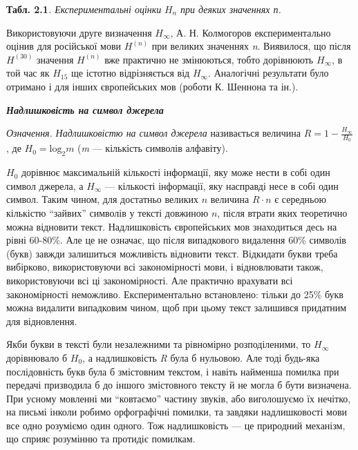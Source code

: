 \bigskip

{\centering
\textbf{Табл. 2.1}\textit{. Експериментальні оцінки } ${H_{{n}}}$ \textit{при
деяких значеннях п.  }
\par}


\bigskip

Використовуючи друге визначення  ${H_{{\infty }}}$, А. Н. Колмогоров
експериментально оцінив для російської мови  ${H^{{(n)}}}$ при великих
значеннях \textit{n}. Виявилося, що після  ${H^{{(\text{30})}}}$ значення 
${H^{{(n)}}}$ вже практично не змінюються, тобто дорівнюють  ${H_{{\infty }}}$,
в той час як  ${H_{{\text{15}}}}$ ще істотно відрізняється від  ${H_{{\infty
}}}$. Аналогічні результати було отримано  і для інших європейських мов (роботи
К. Шеннона та ін.).


\bigskip


\bigskip

{\centering\bfseries\itshape
Надлишковість на символ джерела
\par}


\bigskip


\bigskip

\textit{Означення.} \textit{Надлишковістю на символ джерела} називається
величина  ${R=1-\frac{H_{{\infty }}}{H_{{0}}}}$, де 
${H_{{0}}=\text{log}_{{2}}m}$ (\textit{m} --- кількість символів алфавіту).

 ${H_{{0}}}$ дорівнює максимальній кількості інформації, яку може нести в собі
один символ джерела, а  ${H_{{\infty }}}$ --- кількості інформації, яку насправді
несе в собі один символ. Таким чином, для достатньо великих  ${n}$ величина 
${R\cdot n}$ є середньою кількістю “зайвих” символів у тексті довжиною  ${n}$,
після втрати яких теоретично можна відновити текст. Надлишковість європейських
мов знаходиться десь на рівні 60-80\%. Але це не означає, що після випадкового
видалення 60\% символів (букв) завжди залишиться можливість відновити текст.
Відкидати букви треба вибірково, використовуючи всі закономірності мови, і
відновлювати також, використовуючи всі ці закономірності. Але практично
врахувати всі закономірності неможливо. Експериментально встановлено: тільки до
25\% букв можна видалити випадковим чином, щоб при цьому текст залишився
придатним для відновлення.

Якби букви в тексті були незалежними та рівномірно розподіленими, то 
${H_{{\infty }}}$ дорівнювало б  ${H_{{0}}}$, а надлишковість  \textit{R} була
б нульовою. Але тоді будь-яка послідовність букв була б змістовним текстом, і
навіть найменша помилка при передачі  призводила б до іншого змістовного тексту
й не могла б бути визначена. При усному мовленні ми “ковтаємо” частину звуків,
або виголошуємо їх нечітко, на письмі інколи робимо орфографічні помилки, та
завдяки  надлишковості мови все одно розуміємо один одного. Тож надлишковість ---
це природний механізм, що сприяє розумінню та протидіє помилкам.


